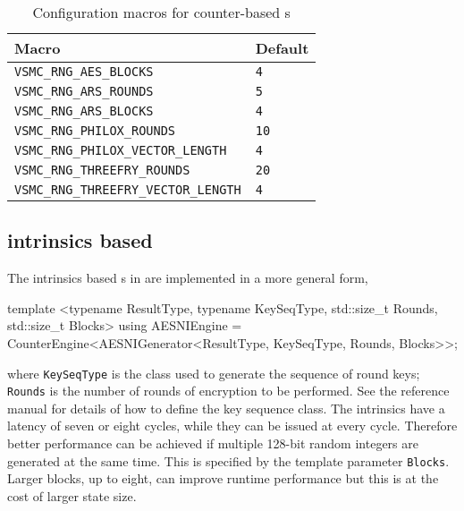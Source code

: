 \begin{table}[t]
  \begin{tabu}{X[l]X[l]}
    \toprule
    Macro & Default \\
    \midrule
    \texttt{VSMC\_RNG\_AES\_BLOCKS} & \texttt{4} \\
    \texttt{VSMC\_RNG\_ARS\_ROUNDS} & \texttt{5} \\
    \texttt{VSMC\_RNG\_ARS\_BLOCKS} & \texttt{4} \\
    \texttt{VSMC\_RNG\_PHILOX\_ROUNDS} & \texttt{10} \\
    \texttt{VSMC\_RNG\_PHILOX\_VECTOR\_LENGTH} & \texttt{4} \\
    \texttt{VSMC\_RNG\_THREEFRY\_ROUNDS} & \texttt{20} \\
    \texttt{VSMC\_RNG\_THREEFRY\_VECTOR\_LENGTH} & \texttt{4} \\
    \bottomrule
  \end{tabu}
  \caption{Configuration macros for counter-based \rng{}s}
  \label{tab:Configuration macros for counter-based RNGs}
\end{table}

\subsection{\protect\aesni intrinsics based \protect\rng}
\label{sub:AES-NI intrinsics based RNG}

The \aesni intrinsics based \rng{}s in \textcite{Salmon:2011um} are implemented
in a more general form,
\begin{cppcode}
  template <typename ResultType, typename KeySeqType, std::size_t Rounds,
  std::size_t Blocks>
  using AESNIEngine =
  CounterEngine<AESNIGenerator<ResultType, KeySeqType, Rounds, Blocks>>;
\end{cppcode}
where \verb|KeySeqType| is the class used to generate the sequence of round
keys; \verb|Rounds| is the number of rounds of \aes encryption to be performed.
See the reference manual for details of how to define the key sequence class.
The \aesni intrinsics have a latency of seven or eight cycles, while they can
be issued at every cycle. Therefore better performance can be achieved if
multiple 128-bit random integers are generated at the same time. This is
specified by the template parameter \verb|Blocks|. Larger blocks, up to eight,
can improve runtime performance but this is at the cost of larger state size.

